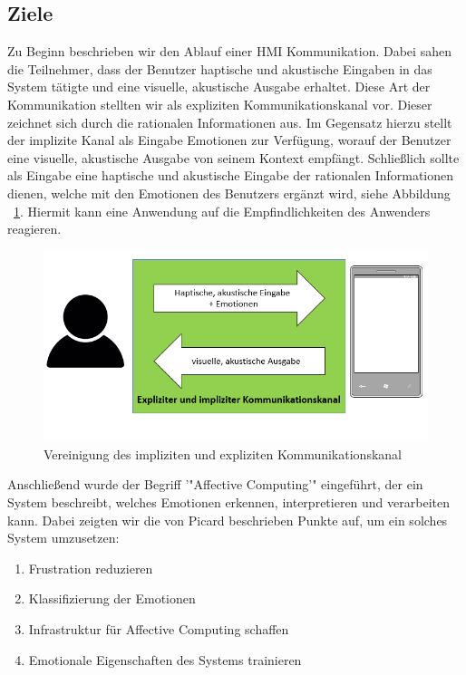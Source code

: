 \subsection{Ziele}

Zu Beginn beschrieben wir den Ablauf einer \ac{HMI} Kommunikation. Dabei sahen die Teilnehmer, dass der Benutzer haptische und akustische Eingaben in das System tätigte und eine visuelle, akustische Ausgabe erhaltet. Diese Art der Kommunikation stellten wir als expliziten Kommunikationskanal vor. Dieser zeichnet sich durch die rationalen Informationen aus. Im Gegensatz hierzu stellt der implizite Kanal als Eingabe Emotionen zur Verfügung, worauf der Benutzer eine visuelle, akustische Ausgabe von seinem Kontext empfängt. Schließlich sollte als Eingabe eine haptische und akustische Eingabe der rationalen Informationen dienen, welche mit den Emotionen des Benutzers ergänzt wird, siehe Abbildung ~\ref{fig:communiationskanal}. Hiermit kann eine Anwendung auf die Empfindlichkeiten des Anwenders reagieren. 

\begin{figure}[!h]
	\centering
	\includegraphics[width=0.9\linewidth]{Pictures/impliziter_expliziter_Kanal}
	\caption[Vereinigung des impliziten und expliziten Kommunikationskanal]{Vereinigung des impliziten und expliziten Kommunikationskanal}
	\label{fig:communiationskanal}
\end{figure}  

Anschließend wurde der Begriff '"Affective Computing'" eingeführt, der ein System beschreibt, welches Emotionen erkennen, interpretieren und verarbeiten kann. Dabei zeigten wir die von Picard beschrieben Punkte auf, um ein solches System umzusetzen:

\vspace{2mm}
\begin{enumerate}
	\item Frustration reduzieren
	\item Klassifizierung der Emotionen
	\item Infrastruktur für Affective Computing schaffen
	\item Emotionale Eigenschaften des Systems trainieren
\end{enumerate}
\vspace{2mm}

